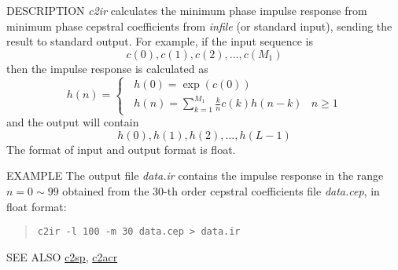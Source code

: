 \begin{synopsis}
 \item[c2ir] [ --l $L$ ] [ --m $M_1$ ] [ --M $M_2$ ] [ --i ] [ {\em infile} ]
\end{synopsis}

\begin{qsection}{DESCRIPTION}
{\em c2ir} calculates the minimum phase impulse response 
from minimum phase cepstral coefficients 
from {\em infile} (or standard input), 
sending the result to standard output.
For example, if the input sequence is
\begin{displaymath}
   c(0),c(1),c(2),\dots,c(M_1)
\end{displaymath}
then the impulse response is calculated as
\begin{displaymath}
 h(n)= \begin{cases}
 \;\; h(0)=\exp(c(0)) & \\
 \;\; h(n)=\displaystyle \sum_{k=1}^{M_1} \frac{k}{n} c(k)h(n-k) & n \geq 1
 \end{cases}
\end{displaymath}
and the output will contain
\begin{displaymath}
   h(0),h(1),h(2),\dots,h(L -1)
\end{displaymath}
The format of input and output format is float.
\end{qsection}

\begin{options}
\end{options}

\begin{qsection}{EXAMPLE}
The output file {\em data.ir} contains the impulse response
in the range $n = 0 \sim 99$ obtained from the 30-th order cepstral
coefficients file {\em data.cep}, in float format:
 \begin{quote}
  \verb!c2ir -l 100 -m 30 data.cep > data.ir!
 \end{quote}
\end{qsection}

\begin{qsection}{SEE ALSO}
\hyperlink{c2sp}{c2sp},
\hyperlink{c2acr}{c2acr}
\end{qsection}
